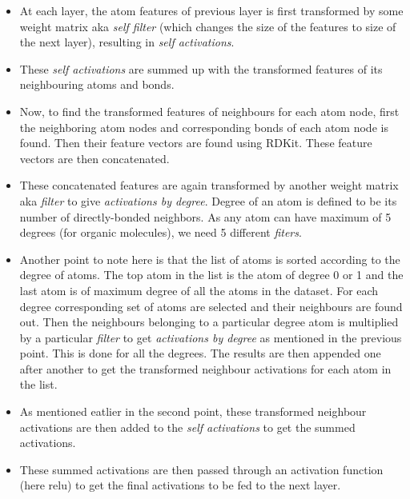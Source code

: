 \documentclass[11pt,a4paper]{report}
\begin{document}
 \begin{itemize}
 \item At each layer, the atom features of previous layer is first transformed by some weight matrix aka \textit{self filter} (which changes the size of the features to size of the next layer), resulting in \textit{self activations}.
 
 \item These \textit{self activations} are summed up with the transformed features of its neighbouring atoms and bonds.
 
 \item Now, to find the transformed features of neighbours for each atom node, first the neighboring atom nodes and corresponding bonds of each atom node is found. Then their feature vectors are found using RDKit. These feature vectors are then concatenated. 
 
 \item These concatenated features are again transformed by another weight matrix aka \textit{filter} to give \textit{activations by degree}. Degree of an atom is defined to be its number of directly-bonded neighbors. As any atom can have maximum of 5 degrees (for organic molecules), we need 5 different \textit{fiters}. 
 
 \item Another point to note here is that the list of atoms is sorted according to the degree of atoms. The top atom in the list is the atom of degree 0 or 1 and the last atom is of maximum degree of all the atoms in the dataset. For each degree corresponding set of atoms are selected and their neighbours are found out. Then the neighbours belonging to a particular degree atom is multiplied by a particular \textit{filter} to get \textit{activations by degree} as mentioned in the previous point. This is done for all the degrees. The results are then appended one after another to get the transformed neighbour activations for each atom in the list.
 
 \item As mentioned eatlier in the second point, these transformed neighbour activations are then added to the \textit{self activations} to get the summed activations. 
 
 \item These summed activations are then passed through an activation function (here relu) to get the final activations to be fed to the next layer. 
 
 \end{itemize}
 
\end{document}
